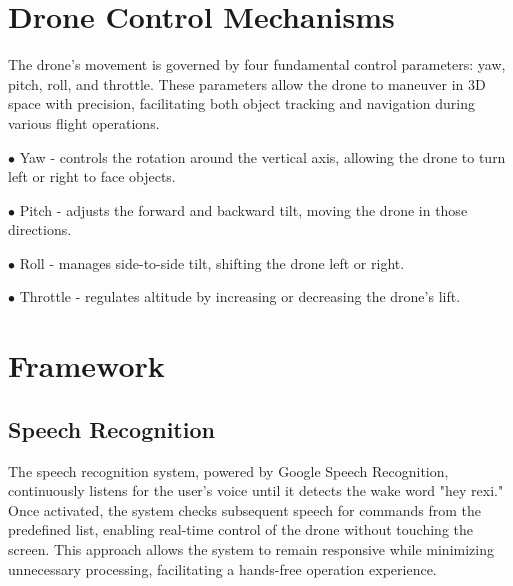 \documentclass[3p,times]{elsarticle}
\begin{document}
\section{Drone Control Mechanisms} \label{sec:framework}
The drone’s movement is governed by four fundamental control parameters: yaw, pitch, roll, and throttle. These parameters allow the drone to maneuver in 3D space with precision, facilitating both object tracking and navigation during various flight operations.\\
\begin{description}
\item $\bullet$ Yaw - controls the rotation around the vertical axis, allowing the drone to turn left or right to face objects.
\item $\bullet$ Pitch - adjusts the forward and backward tilt, moving the drone in those directions.
\item $\bullet$ Roll - manages side-to-side tilt, shifting the drone left or right.
\item $\bullet$ Throttle - regulates altitude by increasing or decreasing the drone’s lift.
\end{description}

\section{Framework} \label{sec:framework}
\subsection{Speech Recognition}
The speech recognition system, powered by Google Speech Recognition, continuously listens for the user’s voice until it detects the wake word "hey rexi." Once activated, the system checks subsequent speech for commands from the predefined list, enabling real-time control of the drone without touching the screen. This approach allows the system to remain responsive while minimizing unnecessary processing, facilitating a hands-free operation experience.
\end{document}
